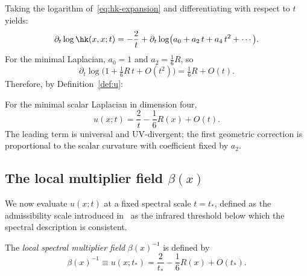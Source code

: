     Taking the logarithm of~\eqref{eq:hk-expansion} and differentiating with respect
    to $t$ yields:
    \begin{equation}
      \partial_t \log \hk(x,x;t)
      = -\frac{2}{t}
      + \partial_t \log\bigl(a_0 + a_2\,t + a_4\,t^2 + \cdots\bigr).
      \label{eq:dlog-hk}
    \end{equation}
    For the minimal Laplacian, $a_0 = 1$ and $a_2 = \frac{1}{6}R$, so
    \begin{equation}
      \partial_t \log\bigl(1 + \tfrac{1}{6}R\,t + O(t^2)\bigr)
      = \tfrac{1}{6}R + O(t).
      \label{eq:log-expand}
    \end{equation}
    Therefore, by Definition~\ref{def:u}:

    \begin{proposition}
      \label{prop:u-expansion}
      For the minimal scalar Laplacian in dimension four,
      \begin{equation}
        u(x;t) = \frac{2}{t} - \frac{1}{6}R(x) + O(t).
        \label{eq:u-expansion}
      \end{equation}
      The leading term is universal and UV-divergent; the first geometric correction is
      proportional to the scalar curvature with coefficient fixed by $a_2$.
    \end{proposition}

  \subsection{The local multiplier field \texorpdfstring{$\beta(x)$}{beta(x)}}
    \label{subsec:beta-field}

    We now evaluate $u(x;t)$ at a fixed spectral scale $t = t_*$, defined as the
    admissibility scale introduced in~\cite{Gravity20,Spectral12} as the infrared
    threshold below which the spectral description is consistent.

    \begin{definition}
      \label{def:beta}
      The \emph{local spectral multiplier field} $\beta(x)^{-1}$ is defined by
      \begin{equation}
        \beta(x)^{-1} \equiv u(x;t_*) = \frac{2}{t_*} - \frac{1}{6}R(x) + O(t_*).
        \label{eq:beta-def}
      \end{equation}
    \end{definition}

